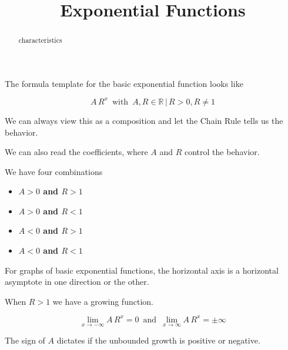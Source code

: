 \documentclass{ximera}
\title{Exponential Functions}
\begin{document}
\begin{abstract}
characteristics
\end{abstract}
\maketitle




The formula template for the basic exponential function looks like




\[  A \, R^x   \, \text{ with } \,  A, R \in \mathbb{R} \, | \,  R > 0, R \ne 1   \]



We can always view this as a composition and let the Chain Rule tells us the behavior.


We can also read the coefficients, where $A$ and $R$ control the behavior.




We have four combinations

\begin{itemize}
\item \textbf{\textcolor{blue!55!black}{$A>0$ and $R>1$}}
\item \textbf{\textcolor{blue!55!black}{$A>0$ and $R<1$}}
\item \textbf{\textcolor{blue!55!black}{$A<0$ and $R>1$}}
\item \textbf{\textcolor{blue!55!black}{$A<0$ and $R<1$}}
\end{itemize}


For graphs of basic exponential functions, the horizontal axis is a horizontal asymptote in one direction or the other.


When $R > 1$ we have a growing function.

\[  \lim_{x \to -\infty} A \, R^x = 0 \, \text{ and } \, \lim_{x \to \infty} A \, R^x = \pm\infty \]


The sign of $A$ dictates if the unbounded growth is positive or negative.
\end{document}
